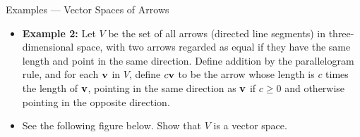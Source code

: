 \begin{frame}[shrink=12]{Examples --- Vector Spaces of Arrows}
\begin{itemize}
\item \textbf{Example 2:} Let $V$ be the set of all arrows (directed line segments) in three-dimensional space, with two arrows regarded as equal if they have the same length and point in the same direction. Define addition by the parallelogram rule, and for each $\mathbf{v}$ in $V$, define $c\mathbf{v}$ to be the arrow whose length is $c$ times the length of $\mathbf{v}$, pointing in the same direction as $\mathbf{v}$ if $c\geq0$ and otherwise pointing in the opposite direction.
\item See the following figure below. Show that $V$ is a vector space.
\end{itemize}
\centering
{}
\end{frame}

